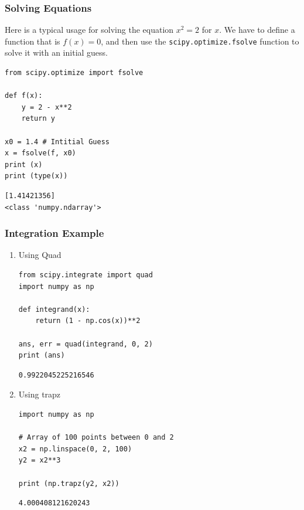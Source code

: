 \documentclass[11pt]{article}
\begin{document}
\subsubsection{Solving Equations}
\label{sec:org8a4fca9}
Here is a typical usage for solving the equation \(x^2 = 2\) for \(x\). We have to define a function that is \(f(x) = 0\), and then use the \texttt{scipy.optimize.fsolve} function to solve it with an initial guess.

\begin{verbatim}
from scipy.optimize import fsolve

def f(x):
    y = 2 - x**2
    return y

x0 = 1.4 # Intitial Guess
x = fsolve(f, x0)
print (x)
print (type(x))
\end{verbatim}

\begin{verbatim}
[1.41421356]
<class 'numpy.ndarray'>
\end{verbatim}



\subsubsection{Integration Example}
\label{sec:org3e774d2}

\begin{enumerate}
\item Using Quad
\label{sec:orgd48ab52}
\begin{verbatim}
from scipy.integrate import quad
import numpy as np

def integrand(x):
    return (1 - np.cos(x))**2

ans, err = quad(integrand, 0, 2)
print (ans)
\end{verbatim}

\begin{verbatim}
0.9922045225216546
\end{verbatim}


\item Using trapz
\label{sec:org86505ae}

\begin{verbatim}
import numpy as np

# Array of 100 points between 0 and 2
x2 = np.linspace(0, 2, 100)
y2 = x2**3

print (np.trapz(y2, x2))
\end{verbatim}

\begin{verbatim}
4.000408121620243
\end{verbatim}
\end{enumerate}
\end{document}
